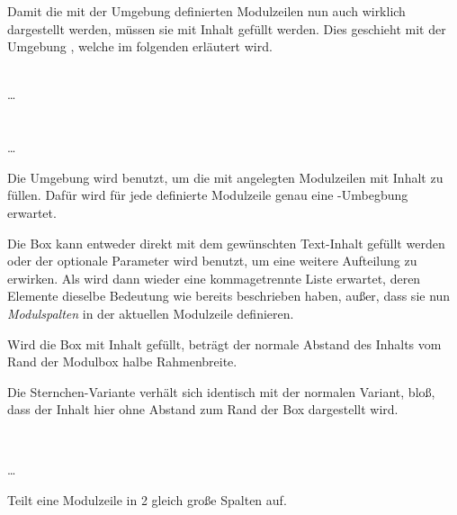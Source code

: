 Damit die mit der Umgebung  definierten Modulzeilen
nun auch wirklich dargestellt werden,
müssen sie mit Inhalt gefüllt werden. Dies geschieht mit der Umgebung
, welche im folgenden erläutert wird.

\begin{Declaration}
    \\%
  \quad\dots\\
  \\
    \\%
  \quad\dots\\
\end{Declaration}

Die Umgebung  wird benutzt,
um die mit  angelegten Modulzeilen mit Inhalt zu füllen.
Dafür wird für jede definierte Modulzeile genau eine
-Umbegbung erwartet.

Die Box kann entweder direkt mit dem gewünschten Text-Inhalt gefüllt werden
oder der optionale Parameter  wird benutzt, um
eine weitere Aufteilung zu erwirken.
Als  wird dann wieder eine kommagetrennte Liste erwartet,
deren Elemente dieselbe Bedeutung wie bereits beschrieben haben, außer, dass
sie nun \emph{Modulspalten} in der aktuellen Modulzeile definieren.

Wird die Box mit Inhalt gefüllt, beträgt der normale Abstand des Inhalts
vom Rand der Modulbox halbe Rahmenbreite.

Die Sternchen-Variante  verhält sich identisch mit
der normalen Variant, bloß, dass der Inhalt hier ohne Abstand zum Rand der Box
dargestellt wird. 

\begin{minipage}{0.6\textwidth}
\begin{example}~\par
  \noindent{}
    \par
  \quad\dots\\
  \bigskip\par
  \noindent Teilt eine Modulzeile in 2 gleich große Spalten auf.
\end{example}
\end{minipage}
\hfill
\begin{minipage}{0.3\textwidth}\centering
\end{minipage}

